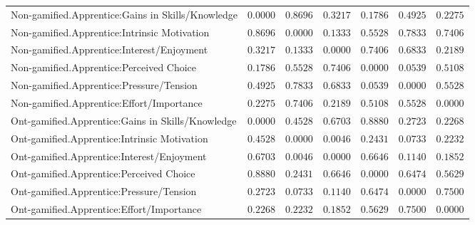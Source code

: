 \begin{landscape}
{\begin{longtable}{lrrrrrr}


Non-gamified.Apprentice:Gains in Skills/Knowledge&$0.0000$&$0.8696$&$0.3217$&$0.1786$&$0.4925$&$0.2275$\tabularnewline
Non-gamified.Apprentice:Intrinsic Motivation&$0.8696$&$0.0000$&$0.1333$&$0.5528$&$0.7833$&$0.7406$\tabularnewline
Non-gamified.Apprentice:Interest/Enjoyment&$0.3217$&$0.1333$&$0.0000$&$0.7406$&$0.6833$&$0.2189$\tabularnewline
Non-gamified.Apprentice:Perceived Choice&$0.1786$&$0.5528$&$0.7406$&$0.0000$&$0.0539$&$0.5108$\tabularnewline
Non-gamified.Apprentice:Pressure/Tension&$0.4925$&$0.7833$&$0.6833$&$0.0539$&$0.0000$&$0.5528$\tabularnewline
Non-gamified.Apprentice:Effort/Importance&$0.2275$&$0.7406$&$0.2189$&$0.5108$&$0.5528$&$0.0000$\tabularnewline
\hline

Ont-gamified.Apprentice:Gains in Skills/Knowledge&$0.0000$&$0.4528$&$0.6703$&$0.8880$&$0.2723$&$0.2268$\tabularnewline
Ont-gamified.Apprentice:Intrinsic Motivation&$0.4528$&$0.0000$&$0.0046$&$0.2431$&$0.0733$&$0.2232$\tabularnewline
Ont-gamified.Apprentice:Interest/Enjoyment&$0.6703$&$0.0046$&$0.0000$&$0.6646$&$0.1140$&$0.1852$\tabularnewline
Ont-gamified.Apprentice:Perceived Choice&$0.8880$&$0.2431$&$0.6646$&$0.0000$&$0.6474$&$0.5629$\tabularnewline
Ont-gamified.Apprentice:Pressure/Tension&$0.2723$&$0.0733$&$0.1140$&$0.6474$&$0.0000$&$0.7500$\tabularnewline
Ont-gamified.Apprentice:Effort/Importance&$0.2268$&$0.2232$&$0.1852$&$0.5629$&$0.7500$&$0.0000$\tabularnewline
\hline
\end{longtable}}\end{landscape}


